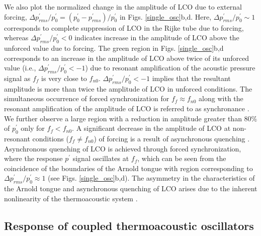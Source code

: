 \documentclass[%
preprint,
 amsmath,amssymb,
 aps,
 pra,
]{revtex4-2}
\begin{document}
We also plot the normalized change in the amplitude of LCO due to external forcing, $\Delta p^\prime_{rms}/p^\prime_{0} = (p^\prime_{0}-p^\prime_{rms})/p^\prime_{0}$ in Figs. \ref{single_osc}b,d. Here, $\Delta p^\prime_{rms}/p^\prime_{0} \sim 1$ corresponds to complete suppression of LCO in the Rijke tube due to forcing, whereas $\Delta p^\prime_{rms}/p^\prime_{0}<0$ indicates increase in the amplitude of LCO above the unforced value due to forcing. The green region in Figs. \ref{single_osc}b,d corresponds to an increase in the amplitude of LCO above twice of its unforced value (i.e., $\Delta p^\prime_{rms}/p^\prime_{0}<-1$) due to resonant amplification of the acoustic pressure signal as $f_f$ is very close to $f_{n0}$. $\Delta p^\prime_{rms}/p^\prime_{0}<-1$ implies that the resultant amplitude is more than twice the amplitude of LCO in unforced conditions. The simultaneous occurrence of forced synchronization for $f_f \approx f_{n0}$ along with the resonant amplification of the amplitude of LCO is referred to as synchronance \cite{mondal2019forced}. We further observe a large region with  a reduction in amplitude greater than $80\%$ of $p^\prime_{0}$ only for $f_f < f_{n0}$. A significant decrease in the amplitude of LCO at non-resonant conditions ($f_f \neq f_{n0}$) of forcing is a result of asynchronous quenching \cite{mondal2019forced, guan2019open}. Asynchronous quenching of LCO is achieved through forced synchronization, where the response $p^\prime$ signal oscillates at $f_f$, which can be seen from the coincidence of the boundaries of the Arnold tongue with region corresponding to $\Delta p^\prime_{rms}/p^\prime_{0} \approx 1$ (see Figs. \ref{single_osc}b,d). The asymmetry in the characteristics of the Arnold tongue and asynchronous quenching of LCO arises due to the inherent nonlinearity of the thermoacoustic system \cite{kashinath2018forced}.  


\subsection{Response of coupled thermoacoustic oscillators}
\label{Results:2}
\end{document}
